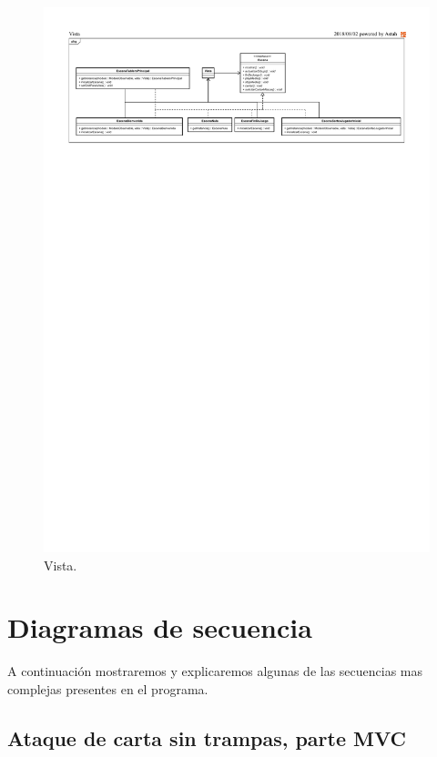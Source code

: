 	\begin{figure}[H]
		\centering
		\includegraphics[scale=0.8]{includes/class_Vista}
		\caption{Vista.}
		\label{class_Vista}
	\end{figure}
	
	
	\clearpage
	\section{Diagramas de secuencia}
	
	A continuación mostraremos y explicaremos algunas de las secuencias mas complejas presentes en el programa.
	
	\subsection{Ataque de carta sin trampas, parte MVC}
	
